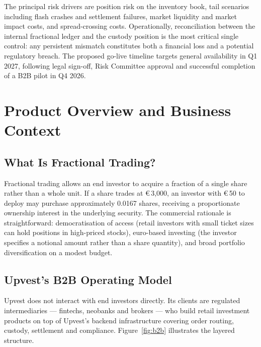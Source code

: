 \documentclass[12pt,a4paper]{report}
\newcommand{\eur}{\euro\,}
\begin{document}
The principal risk drivers are position risk on the inventory book, tail scenarios including
flash crashes and settlement failures, market liquidity and market impact costs, and
spread-crossing costs. Operationally, reconciliation between the internal fractional ledger
and the custody position is the most critical single control: any persistent mismatch
constitutes both a financial loss and a potential regulatory breach. The proposed go-live
timeline targets general availability in Q1 2027, following legal sign-off, Risk Committee
approval and successful completion of a B2B pilot in Q4 2026.

\chapter{Product Overview and Business Context}

\section{What Is Fractional Trading?}

Fractional trading allows an end investor to acquire a fraction of a single share rather than
a whole unit. If a share trades at \eur{}3{,}000, an investor with \eur{}50 to deploy may
purchase approximately 0.0167 shares, receiving a proportionate ownership interest in the
underlying security. The commercial rationale is straightforward: democratisation of access
(retail investors with small ticket sizes can hold positions in high-priced stocks),
euro-based investing (the investor specifies a notional amount rather than a share quantity),
and broad portfolio diversification on a modest budget.

\section{Upvest's B2B Operating Model}

Upvest does not interact with end investors directly. Its clients are regulated intermediaries
--- fintechs, neobanks and brokers --- who build retail investment products on top of
Upvest's backend infrastructure covering order routing, custody, settlement and compliance.
Figure~\ref{fig:b2b} illustrates the layered structure.
\end{document}

